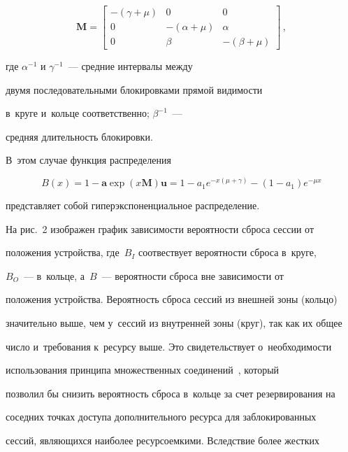   $$


  \mathbf{M} =\begin{bmatrix}


  -(\gamma+\mu) &0&0\\


  0& -(\alpha +\mu) &\alpha\\


  0& \beta & -(\beta+\mu)


  \end{bmatrix}\,,


  $$


  где $\alpha^{-1}$ и $\gamma^{-1}$~--- средние интервалы между 


  двумя последовательными блокировками прямой видимости 


  в~круге и~кольце соответственно; $\beta^{-1}$~--- 


средняя длительность блокировки. 


%


В~этом случае функция распределения 


$$


B(x)= 1- \mathbf{a}\exp 


(x\mathbf{M})\mathbf{u}= 1- a_1 e^{-x(\mu+\gamma)} - \left(1-{a}_1\right)e^{-\mu x}


$$ 


представляет собой гиперэкспоненциальное распределение. 





  На рис.~2 изображен график зависимости вероятности сброса сессии от 


положения устройства, где~$B_I$ соотвествует вероятности сброса в~круге, 


$B_O$~--- в~кольце, а~$B$~--- вероятности сброса вне зависимости от 


положения устройства. Вероятность сброса сессий из внешней зоны (кольцо) 


значительно выше, чем у~сессий из внутренней зоны (круг), так как их общее 


число и~требования к~ресурсу выше. Это свидетельствует о~необходимости 


использования принципа множественных соединений~\cite{8-bs}, который 


позволил бы снизить вероятность сброса в~кольце за счет резервирования на 


соседних точках доступа дополнительного ресурса для заблокированных 


сессий, являющихся наиболее ресурсоемкими. Вследствие более жестких 


